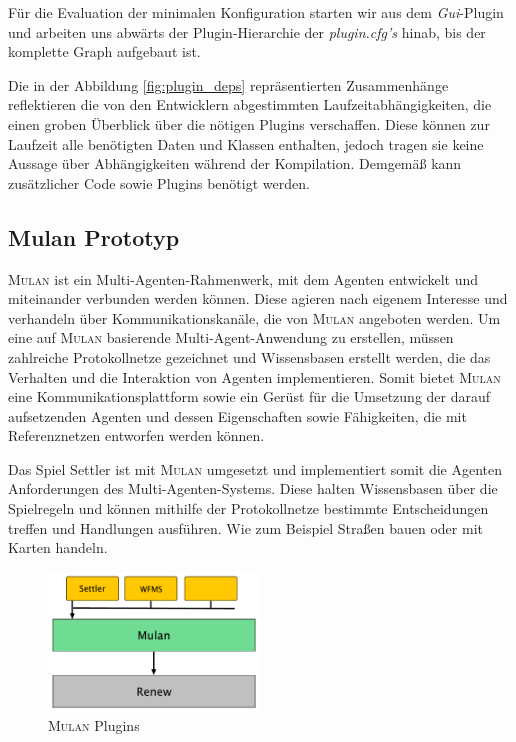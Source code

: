 		Für die Evaluation der minimalen Konfiguration starten wir aus dem \textit{Gui}-Plugin und arbeiten uns abwärts der Plugin-Hierarchie der \textit{plugin.cfg's} hinab, bis der komplette Graph aufgebaut ist. \newline

		Die in der Abbildung \ref{fig:plugin_deps} repräsentierten Zusammenhänge reflektieren die von den Entwicklern abgestimmten Laufzeitabhängigkeiten, die einen groben Überblick über die nötigen Plugins verschaffen. Diese können zur Laufzeit alle benötigten Daten und Klassen enthalten, jedoch tragen sie keine Aussage über Abhängigkeiten während der Kompilation. Demgemäß kann zusätzlicher Code sowie Plugins benötigt werden. 

	\subsection{Mulan Prototyp} \label{sub:mulan}
		\textsc{Mulan} \cite{Roelke04} ist ein Multi-Agenten-Rahmenwerk, mit dem Agenten entwickelt und miteinander verbunden werden können. Diese agieren nach eigenem Interesse und verhandeln über Kommunikationskanäle, die von \textsc{Mulan} angeboten werden. Um eine auf \textsc{Mulan} basierende Multi-Agent-Anwendung zu erstellen, müssen zahlreiche Protokollnetze gezeichnet und Wissensbasen erstellt werden, die das Verhalten und die Interaktion von Agenten implementieren. Somit bietet \textsc{Mulan} eine Kommunikationsplattform sowie ein Gerüst für die Umsetzung der darauf aufsetzenden Agenten und dessen Eigenschaften sowie Fähigkeiten, die mit Referenznetzen entworfen werden können. \cite{Cabac10a} \bigbreak

		Das Spiel Settler ist mit \textsc{Mulan} umgesetzt und implementiert somit die Agenten Anforderungen des Multi-Agenten-Systems. Diese halten Wissensbasen über die Spielregeln und können mithilfe der Protokollnetze bestimmte Entscheidungen treffen und Handlungen ausführen. Wie zum Beispiel Straßen bauen oder mit Karten handeln.\bigbreak
		
		\begin{figure}[h!]
		  \centering
		  \includegraphics[width=0.5\textwidth]{material/images/settler-mulan-renew.pdf}
		  \caption{\textsc{Mulan} Plugins}
		  \label{fig:mulan_plugin}
		\end{figure}

